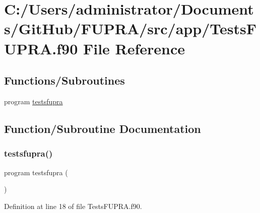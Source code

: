 \hypertarget{_tests_f_u_p_r_a_8f90}{}\section{C\+:/\+Users/administrator/\+Documents/\+Git\+Hub/\+F\+U\+P\+R\+A/src/app/\+Tests\+F\+U\+P\+RA.f90 File Reference}
\label{_tests_f_u_p_r_a_8f90}
\subsection*{Functions/\+Subroutines}
\begin{DoxyCompactItemize}
\item 
program \hyperlink{_tests_f_u_p_r_a_8f90_af6d00829ed91102291ffd1199052a1f4}{testsfupra}
\end{DoxyCompactItemize}


\subsection{Function/\+Subroutine Documentation}
\mbox{\label{_tests_f_u_p_r_a_8f90_af6d00829ed91102291ffd1199052a1f4}} 
\subsubsection{\texorpdfstring{testsfupra()}{testsfupra()}}
{\footnotesize\ttfamily program testsfupra (\begin{DoxyParamCaption}{ }\end{DoxyParamCaption})}



Definition at line 18 of file Tests\+F\+U\+P\+R\+A.\+f90.

